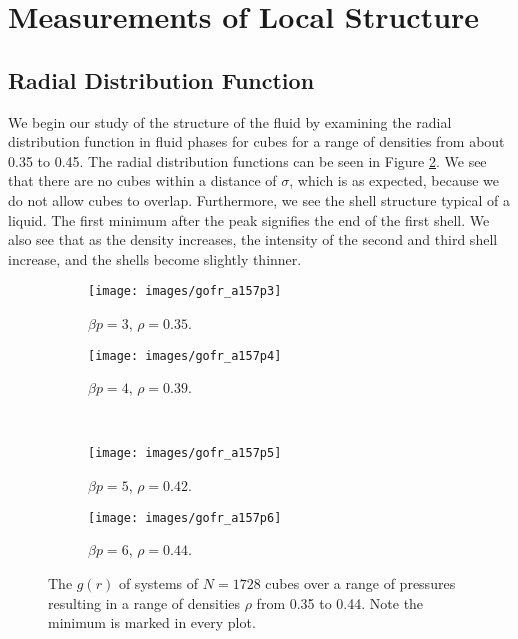 \documentclass[thesis]{subfiles}
\begin{document}
\section{Measurements of Local Structure}

\subsection{Radial Distribution Function} \label{subsec:res_rdf}

We begin our study of the structure of the fluid by examining the radial distribution function in fluid phases for cubes for a range of densities from about 0.35 to 0.45. The radial distribution functions can be seen in Figure \ref{fig:gofr_90liq}. We see that there are no cubes within a distance of $\sigma$, which is as expected, because we do not allow cubes to overlap. Furthermore, we see the shell structure typical of a liquid. %
The first minimum after the peak signifies the end of the first shell. We also see that as the density increases, the intensity of the second and third shell increase, and the shells become slightly thinner.

\begin{figure}[h]
	\centering
	\begin{subfigure}{0.49\textwidth}
		\texttt{[image: images/gofr\_a157p3]}
		\caption{$\beta p = 3$, $\rho = 0.35$. }
	\end{subfigure}
	\begin{subfigure}{0.49\textwidth}
		\texttt{[image: images/gofr\_a157p4]}
		\caption{$\beta p = 4$, $\rho = 0.39$. }
	\end{subfigure}
\\
\vspace{10pt}
	\begin{subfigure}{0.49\textwidth}
		\texttt{[image: images/gofr\_a157p5]}
		\caption{$\beta p = 5$, $\rho = 0.42$. }
	\end{subfigure}
	\begin{subfigure}{0.49\textwidth}
		\texttt{[image: images/gofr\_a157p6]}
		\caption{$\beta p = 6$, $\rho = 0.44$. }\label{fig:gofr_90liqp6}
	\end{subfigure}

	\caption{The $g(r)$ of systems of $N = 1728$ cubes over a range of pressures resulting in a range of densities $\rho$ from 0.35 to 0.44. Note the minimum is marked in every plot.}\label{fig:gofr_90liq}
\end{figure}
\end{document}
